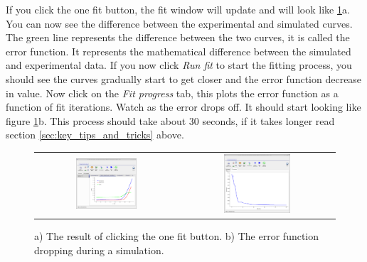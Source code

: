 If you click the one fit button, the fit window will update and will look like \ref{fig:fit_one_fit}a. You can now see the difference between the experimental and simulated curves.  The green line represents the difference between the two curves, it is called the error function. It represents the mathematical difference between the simulated and experimental data.  If you now click \emph{Run fit} to start the fitting process, you should see the curves gradually start to get closer and the error function decrease in value. Now click on the \emph{Fit progress} tab, this plots the error function as a function of fit iterations.  Watch as the error drops off. It should start looking like figure \ref{fig:fit_one_fit}b.  This process should take about 30 seconds, if it takes longer read section \ref{sec:key_tips_and_tricks} above.

\begin{figure}[H]
\centering
\begin{tabular}{ c c }

\includegraphics[width=0.45\textwidth]{./images/fit/fit_delta.png}
&
\includegraphics[width=0.45\textwidth]{./images/fit/fit_converge.png}
\\
\end{tabular}
\caption{a) The result of clicking the one fit button. b) The error function dropping during a simulation.}
\label{fig:fit_one_fit}
\end{figure}

